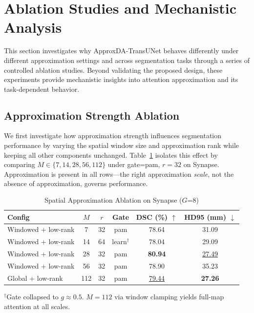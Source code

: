 \section{Ablation Studies and Mechanistic Analysis}
\label{sec:understanding}

This section investigates why ApproxDA-TransUNet behaves differently under different approximation settings and across segmentation tasks through a series of controlled ablation studies. Beyond validating the proposed design, these experiments provide mechanistic insights into attention approximation and its task-dependent behavior.

\subsection{Approximation Strength Ablation}
\label{sec:approx_scale}

We first investigate how approximation strength influences segmentation performance by varying the spatial window size and approximation rank while keeping all other components unchanged. Table~\ref{tab:window_ablation} isolates this effect by comparing $M{\in}\{7,14,28,56,112\}$ under gate=pam, $r{=}32$ on Synapse. Approximation is present in all rows---the right approximation \emph{scale}, not the absence of approximation, governs performance.

\begin{table}[ht]
  \caption{Spatial Approximation Ablation on Synapse ($G$=8)}
  \label{tab:window_ablation}
  \begin{center}
  \setlength{\tabcolsep}{2pt}
  \small
  \begin{tabular}{lccccc}
    \toprule
    Config & $M$ & $r$ & Gate & DSC (\%) $\uparrow$ & HD95 (mm) $\downarrow$ \\
    \midrule
    Windowed + low-rank & 7   & 32 & pam          & 78.64          & 31.09 \\
    Windowed + low-rank & 14  & 64 & learn$^\dag$ & 78.04          & 29.09 \\
    Windowed + low-rank & 28  & 32 & pam          & \textbf{80.94} & \underline{27.49} \\
    Windowed + low-rank & 56  & 32 & pam          & 78.90          & 35.23 \\
    Global + low-rank   & 112 & 32 & pam          & \underline{79.44} & \textbf{27.26} \\
    \bottomrule
  \end{tabular}
  \end{center}
  \vspace{-0.3em}
  \footnotesize{$^\dag$Gate collapsed to $g{\approx}0.5$. $M{=}112$ via window clamping yields full-map attention at all scales.}
\end{table}

